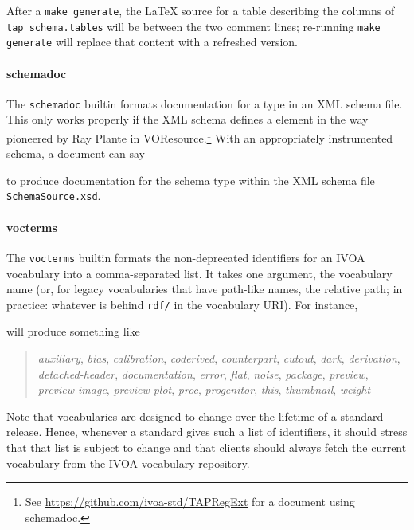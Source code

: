 \documentclass[11pt,a4paper]{ivoa}
\begin{document}


After a \texttt{make generate}, the LaTeX source for a table describing
the columns of \texttt{tap\_schema.tables} will be between the two
comment lines; re-running \texttt{make generate} will replace that
content with a refreshed version.

\paragraph{schemadoc}

The \texttt{schemadoc} builtin formats
documentation for a type in an XML schema file.  This only works
properly if the XML schema defines a  element in
the way pioneered by Ray Plante in
VOResource.\footnote{See
\url{https://github.com/ivoa-std/TAPRegExt} for a document using
schemadoc.}
With an appropriately instrumented schema, a document can say

to produce documentation for the schema type  within
the XML schema file \texttt{SchemaSource.xsd}.

\paragraph{vocterms}

The \texttt{vocterms} builtin formats the non-deprecated identifiers for
an IVOA vocabulary \citep{2021ivoa.spec.0525D} into a comma-separated
list.  It takes one argument, the vocabulary name (or, for legacy
vocabularies that have path-like names, the relative path; in practice:
whatever is behind \texttt{rdf/} in the vocabulary URI).  For instance,



will produce something like

\begin{quotation}
\noindent
\textsl{auxiliary},
\textsl{bias},
\textsl{calibration},
\textsl{coderived},
\textsl{counterpart},
\textsl{cutout},
\textsl{dark},
\textsl{derivation},
\textsl{detached-header},
\textsl{documentation},
\textsl{error},
\textsl{flat},
\textsl{noise},
\textsl{package},
\textsl{preview},
\textsl{preview-image},
\textsl{preview-plot},
\textsl{proc},
\textsl{progenitor},
\textsl{this},
\textsl{thumbnail},
\textsl{weight}
\end{quotation}

Note that vocabularies are designed to change over the lifetime of a
standard release.  Hence, whenever a standard gives such a
list of identifiers, it should stress that that list is subject to
change and that clients should always fetch the current vocabulary from
the IVOA vocabulary repository.
\end{document}
